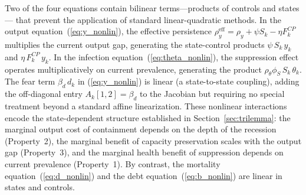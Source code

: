 Two of the four equations contain bilinear terms---products of controls and states---
that prevent the application of standard linear-quadratic methods. In the output
equation~(\ref{eq:y_nonlin}), the effective persistence
$\rho_y^{\text{eff}} = \rho_y + \psi S_k - \eta F_k^{CP}$ multiplies the current
output gap, generating the state-control products $\psi\, S_k\, y_k$ and
$\eta\, F_k^{CP}\, y_k$. In the infection equation~(\ref{eq:theta_nonlin}), the
suppression effect operates multiplicatively on current prevalence, generating the
product $\rho_\theta \phi_S\, S_k\, \theta_k$. The fear term $\beta_d\, d_k$ in
(\ref{eq:y_nonlin}) is linear (a state-to-state coupling), adding the off-diagonal
entry $A_k[1,2] = \beta_d$ to the Jacobian but requiring no special treatment beyond
a standard affine linearization. These nonlinear interactions encode the
state-dependent structure established in Section~\ref{sec:trilemma}: the marginal
output cost of containment depends on the depth of the recession (Property~2), the
marginal benefit of capacity preservation scales with the output gap (Property~3),
and the marginal health benefit of suppression depends on current prevalence
(Property~1). By contrast, the mortality equation~(\ref{eq:d_nonlin}) and the debt
equation~(\ref{eq:b_nonlin}) are linear in states and controls.

